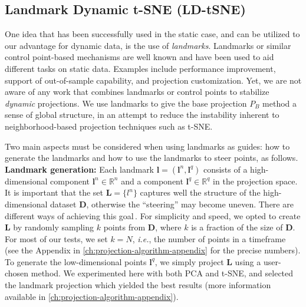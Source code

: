 \subsection{Landmark Dynamic t-SNE (LD-tSNE)}
\label{sec:ld-tsne}
%
One idea that has been successfully used in the static case, and can be utilized to our advantage for dynamic data, is the use of \emph{landmarks}. 
Landmarks or similar control point-based mechanisms are well known and have been used to aid different tasks on static data. Examples include performance improvement\citep{Pekalska1999,DeSilva2003,DeSilva2004,Vladymyrov2013,Paulovich2008,Kruiger2017a}, support of out-of-sample capability\citep{Boytsov2017,Policar2019}, and projection customization\citep{Joia2011,updis}.
Yet, we are not aware of any work that combines landmarks or control points to stabilize \emph{dynamic} projections. We use landmarks to give the base projection $P_B$ method a sense of global structure, in an attempt to reduce the instability inherent to neighborhood-based projection techniques such as t-SNE.

Two main aspects must be considered when using landmarks as guides: how to generate the landmarks and how to use the landmarks to steer points, as follows.\\

\vspace{-0.15cm}
\noindent\textbf{Landmark generation:} Each landmark $\mathbf{l}=\left(\mathbf{l}^n, \mathbf{l}^q\right)$ consists of a high-dimensional component $\mathbf{l}^n \in \mathbb{R}^n$ and a component $\mathbf{l}^q \in \mathbb{R}^q$ in the projection space.
It is important that the set $\mathbf{L} = \{ l^n \}$ captures well the structure of the high-dimensional dataset $\mathbf{D}$, otherwise the ``steering'' may become uneven. There are different ways of achieving this goal\,\citep{DeSilva2005}. For simplicity and speed, we opted to create $\mathbf{L}$ by randomly sampling $k$ points from $\mathbf{D}$, where $k$ is a fraction of the size of $\mathbf{D}$. For most of our tests, we set $k=N$, \emph{i.e.}, the number of points in a timeframe (see the Appendix in \cref{ch:projection-algorithm-appendix} for the precise numbers). To generate the low-dimensional points $\mathbf{l}^q$, we simply project $\mathbf{L}$ using a user-chosen method. We experimented here with both PCA and t-SNE, and selected the landmark projection which yielded the best results (more information available in \cref{ch:projection-algorithm-appendix}).\\

